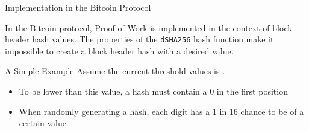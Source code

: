 \documentclass[]{beamer}
\begin{document}
\begin{frame}{Implementation in the Bitcoin Protocol}

In the Bitcoin protocol, Proof of Work is implemented in the context of \color{focus}block header hash values\color{black}. The properties of the \texttt{dSHA256} hash function make it impossible to create a block header hash with a desired value.


 	
\end{frame}

\begin{frame}{A Simple Example}
	Assume the current threshold values is
	.
	
	\begin{itemize}
		\item To be lower than this value, a hash must contain a 0 in the first position
		\item When randomly generating a hash, each digit has a 1 in 16 chance to be of a certain value
	\end{itemize}

	
\end{frame}
\end{document}
